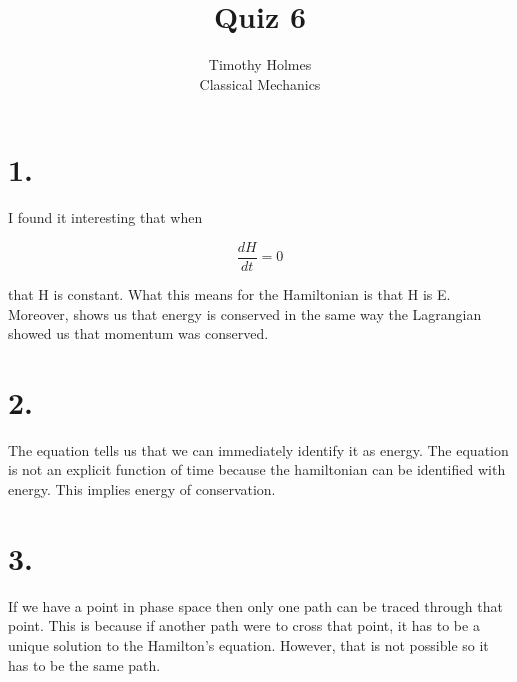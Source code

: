 \documentclass[12pt]{article}
\begin{document}
 
 
\title{Quiz 6}
\author{Timothy Holmes\\ %
Classical Mechanics}

\maketitle

\section*{1.}

I found it interesting that when

$$
\frac{dH}{dt} = 0 
$$

\noindent
that H is constant. What this means for the Hamiltonian is that H is E. Moreover, shows us that energy is conserved in the same way the Lagrangian showed us that momentum was conserved. 

\section*{2.}

The equation tells us that we can immediately identify it as energy. The equation is not an explicit function of time because the hamiltonian can be identified with energy. This implies energy of conservation.


\section*{3.}

If we have a point in phase space then only one path can be traced through that point. This is because if another path were to cross that point, it has to be a unique solution to the Hamilton's equation. However, that is not possible so it has to be the same path. 


 
\end{document}
